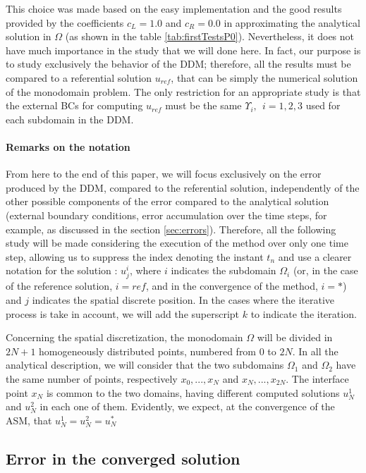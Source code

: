 \indent This choice was made based on the easy implementation and the good results provided by the coefficients $c_L = 1.0$ and $c_R = 0.0$ in approximating the analytical solution in $\Omega$ (as shown in the table \ref{tab:firstTestsP0}). Nevertheless, it does not have much importance in the study that we will done here. In fact, our purpose is to study exclusively the behavior of the DDM; therefore, all the results must be compared to a referential solution $u_{ref}$, that can be simply the numerical solution of the monodomain problem. The only restriction for an appropriate study is that the external BCs for computing $u_{ref}$ must be the same $\Upsilon_i, \ \ i=1,2,3$ used for each subdomain in the DDM.

\paragraph{Remarks on the notation}

\indent From here to the end of this paper, we will focus exclusively on the error produced by the DDM, compared to the referential solution, independently of the other possible components of the error compared to the analytical solution (external boundary conditions, error accumulation over the time steps, for example, as discussed in the section \ref{sec:errors}). Therefore, all the following study will be made considering the execution of the method over only one time step, allowing us to suppress the index denoting the instant $t_n$ and use a clearer notation for the solution : $u_j^i$, where $i$ indicates the subdomain $\Omega_i$ (or, in the case of the reference solution, $i = ref$, and in the convergence of the method, $i = *$) and $j$ indicates the spatial discrete position. In the cases where the iterative process is take in account, we will add the superscript $k$ to indicate the iteration.

\indent Concerning the spatial discretization, the monodomain $\Omega$ will be divided in $2N + 1$ homogeneously distributed points, numbered from $0$ to $2N$. In all the analytical description, we will consider that the two subdomains $\Omega_1$ and $\Omega_2$ have the same number of points, respectively $x_0,...,x_N$ and $x_N,...,x_{2N}$. The interface point $x_N$ is common to the two domains, having different computed solutions $u_N^1$ and $u_N^2$ in each one of them. Evidently, we expect, at the convergence of the ASM, that $u_N^1 = u_N^2 = u_N^*$

\subsection{Error in the converged solution}


